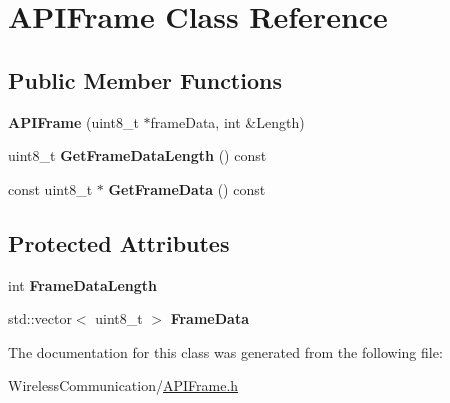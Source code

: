 \hypertarget{class_a_p_i_frame}{}\section{A\+P\+I\+Frame Class Reference}
\label{class_a_p_i_frame}
\subsection*{Public Member Functions}
\begin{DoxyCompactItemize}
\item 
\hypertarget{class_a_p_i_frame_a49e61a04eb3a88c219e123dbc5776bf3}{}{\bfseries A\+P\+I\+Frame} (uint8\+\_\+t $\ast$frame\+Data, int \&Length)\label{class_a_p_i_frame_a49e61a04eb3a88c219e123dbc5776bf3}

\item 
\hypertarget{class_a_p_i_frame_a99d27f3be177320fc342157837a1a980}{}uint8\+\_\+t {\bfseries Get\+Frame\+Data\+Length} () const \label{class_a_p_i_frame_a99d27f3be177320fc342157837a1a980}

\item 
\hypertarget{class_a_p_i_frame_a2af55b4ac6145666fe9e56e5c4fd6184}{}const uint8\+\_\+t $\ast$ {\bfseries Get\+Frame\+Data} () const \label{class_a_p_i_frame_a2af55b4ac6145666fe9e56e5c4fd6184}

\end{DoxyCompactItemize}
\subsection*{Protected Attributes}
\begin{DoxyCompactItemize}
\item 
\hypertarget{class_a_p_i_frame_a6811a17e535f4601c3acbcde0f36c48a}{}int {\bfseries Frame\+Data\+Length}\label{class_a_p_i_frame_a6811a17e535f4601c3acbcde0f36c48a}

\item 
\hypertarget{class_a_p_i_frame_aa447c31d400fd8d96cf89ee2a8e3dbc1}{}std\+::vector$<$ uint8\+\_\+t $>$ {\bfseries Frame\+Data}\label{class_a_p_i_frame_aa447c31d400fd8d96cf89ee2a8e3dbc1}

\end{DoxyCompactItemize}


The documentation for this class was generated from the following file\+:\begin{DoxyCompactItemize}
\item 
Wireless\+Communication/\hyperlink{_a_p_i_frame_8h}{A\+P\+I\+Frame.\+h}\end{DoxyCompactItemize}
